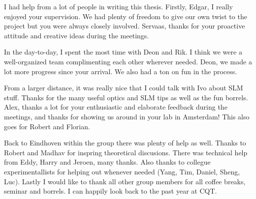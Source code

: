\noindent I had help from a lot of people in writing this thesis.
Firstly, Edgar, I really enjoyed your supervision.
We had plenty of freedom to give our own twist to the project but you were always closely involved.
Servaas, thanks for your proactive attitude and creative ideas during the meetings. 

In the day-to-day, I spent the most time with Deon and Rik. 
I think we were a well-organized team complimenting each other wherever needed.
Deon, we made a lot more progress since your arrival. 
We also had a ton on fun in the process.

From a larger distance, it was really nice that I could talk with Ivo about SLM stuff.
Thanks for the many useful optics and SLM tips as well as the fun borrels.
Alex, thanks a lot for your enthusiastic and elaborate feedback during the meetings, and thanks for showing us around in your lab in Amsterdam!
This also goes for Robert and Florian. 

Back to Eindhoven within the group there was plenty of help as well.
Thanks to Robert and Madhav for inspring theoretical discusions.
There was technical help from Eddy, Harry and Jeroen, many thanks.
Also thanks to collegue experimentallists for helping out whenever needed (Yang, Tim, Daniel, Sheng, Luc).
Lastly I would like to thank all other group members for all coffee breaks, seminar and borrels. 
I can happily look back to the past year at CQT. 
